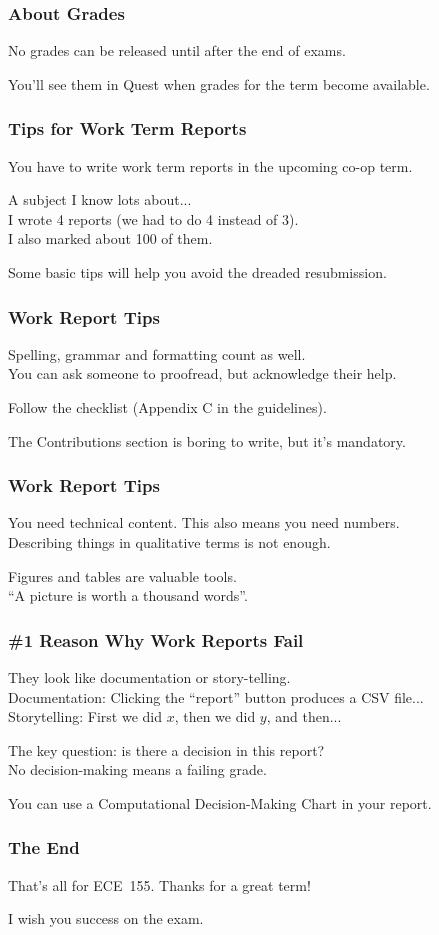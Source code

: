 \begin{frame}
\frametitle{About Grades}

No grades can be released until after the end of exams.

You'll see them in Quest when grades for the term become available.


\end{frame}

\begin{frame}
\frametitle{Tips for Work Term Reports}

You have to write work term reports in the upcoming co-op term.

A subject I know lots about...\\
\quad I wrote 4 reports (we had to do 4 instead of 3).\\
\quad I also marked about 100 of them.

Some basic tips will help you avoid the dreaded resubmission.

\end{frame}


\begin{frame}
\frametitle{Work Report Tips}

Spelling, grammar and formatting count as well.\\
	\quad You can ask someone to proofread, but acknowledge their help.
	
Follow the checklist (Appendix C in the guidelines).

The Contributions section is boring to write, but it's mandatory.

\end{frame}

\begin{frame}
\frametitle{Work Report Tips}

You need technical content. This also means you need numbers.\\
	\quad Describing things in qualitative terms is not enough.

Figures and tables are valuable tools.\\
	\quad ``A picture is worth a thousand words''.

\end{frame}


\begin{frame}
\frametitle{\#1 Reason Why Work Reports Fail}

They look like documentation or story-telling.\\
	\quad Documentation: Clicking the ``report'' button produces a CSV file...\\
	\quad Storytelling: First we did $x$, then we did $y$, and then...

The key question: is there a decision in this report?\\
	\quad No decision-making means a failing grade.
	
You can use a Computational Decision-Making Chart in your report.

\end{frame}


\begin{frame}
\frametitle{The End}

That's all for ECE~155. Thanks for a great term!

I wish you success on the exam.

\end{frame}






